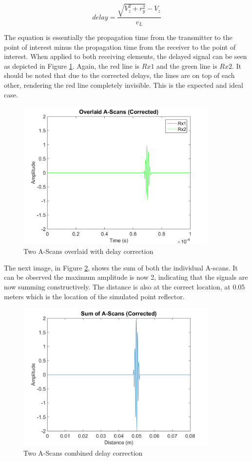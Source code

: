  \begin{equation} \label{eq:cafi_delays}
delay = \frac{\sqrt{V_{z}^2 + r_{y}^2} - V_{z} }{v_L}
 \end{equation}

The equation is essentially the propagation time from the transmitter to the point of interest minus the propagation time from the receiver to the point of interest. When applied to both receiving elements, the delayed signal can be seen as depicted in Figure \ref{fig:cafi_isotropic3}. Again, the red line is $Rx1$ and the green line is $Rx2$. It should be noted that due to the corrected delays, the lines are on top of each other, rendering the red line completely invisible. This is the expected and ideal case.

\begin{figure}[htb]
\centering
		\includegraphics[width=100mm]{Isotropic_3.png}
		\caption{Two A-Scans overlaid with delay correction}
		\label{fig:cafi_isotropic3}
\end{figure}

The next image, in Figure \ref{fig:cafi_isotropic4}, shows the sum of both the individual A-scans. It can be observed the maximum amplitude is now 2, indicating that the signals are now summing constructively. The distance is also at the correct location, at 0.05 meters which is the location of the simulated point reflector.

\begin{figure}[htb]
\centering
		\includegraphics[width=100mm]{Isotropic_4.png}
		\caption{Two A-Scans combined delay correction}
		\label{fig:cafi_isotropic4}
\end{figure}
\clearpage


